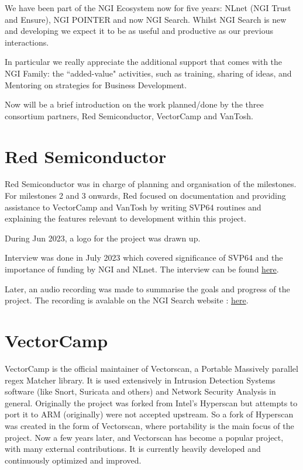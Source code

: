 We have been part of the \acrshort{NGI} Ecosystem now for five years:
NLnet (\acrshort{NGI} Trust and Ensure), \acrshort{NGI} POINTER and now \acrshort{NGI} Search.
Whilst \acrshort{NGI} Search is new and developing we expect it to be as
useful and productive as our previous interactions.

In particular we really appreciate the additional support that
comes with the \acrshort{NGI} Family: the ``added-value" activities, such
as training, sharing of ideas, and Mentoring on strategies for
Business Development.

Now will be a brief introduction on the work planned/done by the three
consortium partners, Red Semiconductor, VectorCamp and VanTosh.

\section{Red Semiconductor}

Red Semiconductor was in charge of planning and organisation of the milestones.
For milestones 2 and 3 onwards, Red focused on documentation and providing
assistance to VectorCamp and VanTosh by writing \acrshort{SVP64} routines and explaining
the features relevant to development within this project.

During Jun 2023, a logo for the project was drawn up.

Interview was done in July 2023 which covered significance of \acrshort{SVP64} and
the importance of funding by \acrshort{NGI} and NLnet.
The interview can be found
\href{https://spaces.fundingbox.com/spaces/ngi-community-ngi-innovators/64b8dadbabf7a659885ee01e}{here}.

Later, an audio recording was made to summarise the goals and progress of the
project. The recording is avalable on the \acrshort{NGI} Search website :
\href{https://www.ngisearch.eu/view/Events/OC1Searchers}{here}.

\section{VectorCamp}

VectorCamp is the official maintainer of Vectorscan, a Portable Massively
parallel \acrfull{regex} Matcher library. It is used extensively in
Intrusion Detection Systems software (like Snort, Suricata and others)
and Network Security Analysis in general. Originally the project was forked
from Intel’s Hyperscan but attempts to port it to \acrshort{ARM} (originally) were not
accepted upstream. So a fork of Hyperscan was created in the form of
Vectorscan, where portability is the main focus of the project.
Now a few years later, and Vectorscan has become a popular project,
with many external contributions. It is currently heavily developed and
continuously optimized and improved.

